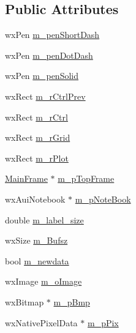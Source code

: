 \subsection*{Public Attributes}
\begin{DoxyCompactItemize}
\item 
wx\-Pen \hyperlink{class_plot_panel_a111adb0975870b5d448da832bd44fc99}{m\-\_\-pen\-Short\-Dash}
\item 
wx\-Pen \hyperlink{class_plot_panel_a227751dba1777b261ffdc27b53fb087d}{m\-\_\-pen\-Dot\-Dash}
\item 
wx\-Pen \hyperlink{class_plot_panel_a229628c08bb7d0fa16589dbf83d635d1}{m\-\_\-pen\-Solid}
\item 
wx\-Rect \hyperlink{class_plot_panel_aef7e50cc8a27b9434d17d7d8c245606c}{m\-\_\-r\-Ctrl\-Prev}
\item 
wx\-Rect \hyperlink{class_plot_panel_a2c10cfe6bcd979613cec037a71ba2c94}{m\-\_\-r\-Ctrl}
\item 
wx\-Rect \hyperlink{class_plot_panel_ae8d79eab28220ea1fa8ffcbfd70bc84a}{m\-\_\-r\-Grid}
\item 
wx\-Rect \hyperlink{class_plot_panel_aa4d6249f2f09d03682b8fa704be04548}{m\-\_\-r\-Plot}
\item 
\hyperlink{class_main_frame}{Main\-Frame} $\ast$ \hyperlink{class_plot_panel_ad28637582a93843082fc7b1d8d80c807}{m\-\_\-p\-Top\-Frame}
\item 
wx\-Aui\-Notebook $\ast$ \hyperlink{class_plot_panel_a63b99d2f75a6486dda96f4934ba369fa}{m\-\_\-p\-Note\-Book}
\item 
double \hyperlink{class_plot_panel_a00eb5aef94866f0f385fcf793cb841b6}{m\-\_\-label\-\_\-size}
\item 
wx\-Size \hyperlink{class_plot_panel_a61a49a35721e334b959e833464add15f}{m\-\_\-\-Bufsz}
\item 
bool \hyperlink{class_plot_panel_a803a71153ab9758b6134fc51855a71b3}{m\-\_\-newdata}
\item 
wx\-Image \hyperlink{class_plot_panel_a455990d37fec44ad2eeb97b6be7016fe}{m\-\_\-o\-Image}
\item 
wx\-Bitmap $\ast$ \hyperlink{class_plot_panel_a931b1810b974771f4f79ebc9b2690833}{m\-\_\-p\-Bmp}
\item 
wx\-Native\-Pixel\-Data $\ast$ \hyperlink{class_plot_panel_abba680c266caf80a5a3f2ab98cbb7796}{m\-\_\-p\-Pix}
\end{DoxyCompactItemize}
